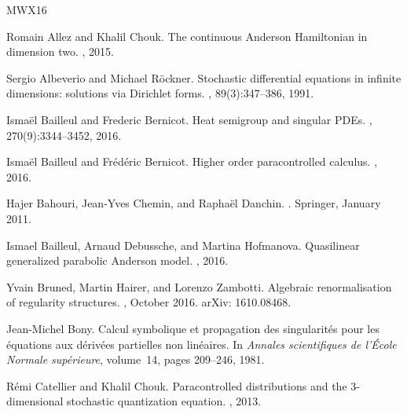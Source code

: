 \documentclass[a4paper, 11pt]{article}
\begin{document}
%
%

\begin{thebibliography}{MWX16}

Romain Allez and Khalil Chouk.
\newblock The continuous {A}nderson {H}amiltonian in dimension two.
, 2015.

Sergio Albeverio and Michael R{\"o}ckner.
\newblock Stochastic differential equations in infinite dimensions: solutions
  via {D}irichlet forms.
, 89(3):347--386, 1991.

Isma{\"e}l Bailleul and Frederic Bernicot.
\newblock Heat semigroup and singular {PDE}s.
, 270(9):3344--3452, 2016.

Isma{\"e}l Bailleul and Fr{\'e}d{\'e}ric Bernicot.
\newblock Higher order paracontrolled calculus.
, 2016.

Hajer Bahouri, Jean-Yves Chemin, and Raphaël Danchin.
.
\newblock Springer, January 2011.

Ismael Bailleul, Arnaud Debussche, and Martina Hofmanova.
\newblock Quasilinear generalized parabolic {A}nderson model.
, 2016.

Yvain Bruned, Martin Hairer, and Lorenzo Zambotti.
\newblock Algebraic renormalisation of regularity structures.
, October 2016.
\newblock arXiv: 1610.08468.

Jean-Michel Bony.
\newblock Calcul symbolique et propagation des singularit{\'e}s pour les
  {\'e}quations aux d{\'e}riv{\'e}es partielles non lin{\'e}aires.
\newblock In {\em Annales scientifiques de l'{\'E}cole Normale sup{\'e}rieure},
  volume~14, pages 209--246, 1981.

R{\'e}mi Catellier and Khalil Chouk.
\newblock Paracontrolled distributions and the 3-dimensional stochastic
  quantization equation.
, 2013.


\end{thebibliography}
\end{document}
